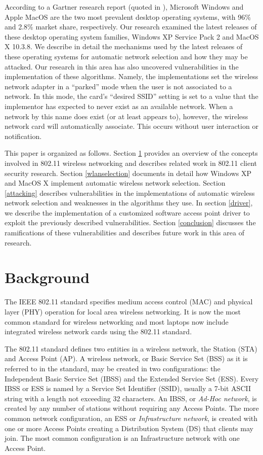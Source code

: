 \documentclass[10pt,twocolumn]{article}
\begin{document}
According to a Gartner research report (quoted in
\cite{lohr04desktop}), Microsoft Windows and Apple MacOS are the two
most prevalent desktop operating systems, with 96\% and 2.8\% market
share, respectively.  Our research examined the latest releases of
these desktop operating system families, Windows XP Service Pack 2 and
MacOS X 10.3.8.  We describe in detail the mechanisms used by the
latest releases of these operating systems for automatic network
selection and how they may be attacked.  Our research in this area has
also uncovered vulnerabilities in the implementation of these
algorithms.  Namely, the implementations set the wireless network
adapter in a ``parked'' mode when the user is not associated to a
network.  In this mode, the card's ``desired SSID'' setting is set to
a value that the implementor has expected to never exist as an
available network.  When a network by this name does exist (or at
least appears to), however, the wireless network card will
automatically associate.  This occurs without user interaction or
notification.

This paper is organized as follows.  Section \ref{background} provides
an overview of the concepts involved in 802.11 wireless networking and
describes related work in 802.11 client security research.  Section
\ref{wlanselection} documents in detail how Windows XP and MacOS X
implement automatic wireless network selection.  Section
\ref{attacking} describes vulnerabilities in the implementations of
automatic wireless network selection and weaknesses in the algorithms
they use.  In section \ref{driver}, we describe the implementation of
a customized software access point driver to exploit the previously
described vulnerabilities.  Section \ref{conclusion} discusses the
ramifications of these vulnerabilities and describes future work in
this area of research.

\section{Background}
\label{background}

The IEEE 802.11 standard \cite{ieee99wireless} specifies medium access
control (MAC) and physical layer (PHY) operation for local area
wireless networking.  It is now the most common standard for wireless
networking and most laptops now include integrated wireless network
cards using the 802.11 standard.

The 802.11 standard defines two entities in a wireless network, the
Station (STA) and Access Point (AP).  A wireless network, or Basic
Service Set (BSS) as it is referred to in the standard, may be created
in two configurations: the Independent Basic Service Set (IBSS) and
the Extended Service Set (ESS).  Every IBSS or ESS is named by a
Service Set Identifier (SSID), usually a 7-bit ASCII string with a
length not exceeding 32 characters.  An IBSS, or {\it Ad-Hoc network},
is created by any number of stations without requiring any Access
Points.  The more common network configuration, an ESS or {\it
Infrastructure network}, is created with one or more Access Points
creating a Distribution System (DS) that clients may join.  The most
common configuration is an Infrastructure network with one Access
Point.
\end{document}
